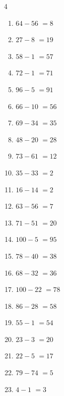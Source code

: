 \begin{multicols}{4}
\begin{enumerate}
  \item $64-56$
        $=8$

  \item $27-8$
        $=19$

  \item $58-1$
        $=57$

  \item $72-1$
        $=71$

  \item $96-5$
        $=91$

  \item $66-10$
        $=56$

  \item $69-34$
        $=35$

  \item $48-20$
        $=28$

  \item $73-61$
        $=12$

  \item $35-33$
        $=2$

  \item $16-14$
        $=2$

  \item $63-56$
        $=7$

  \item $71-51$
        $=20$

  \item $100-5$
        $=95$

  \item $78-40$
        $=38$

  \item $68-32$
        $=36$

  \item $100-22$
        $=78$

  \item $86-28$
        $=58$

  \item $55-1$
        $=54$

  \item $23-3$
        $=20$

  \item $22-5$
        $=17$

  \item $79-74$
        $=5$

\columnbreak %

\resetques

  \item $4-1$
        $=3$


\end{enumerate}
\end{multicols}
